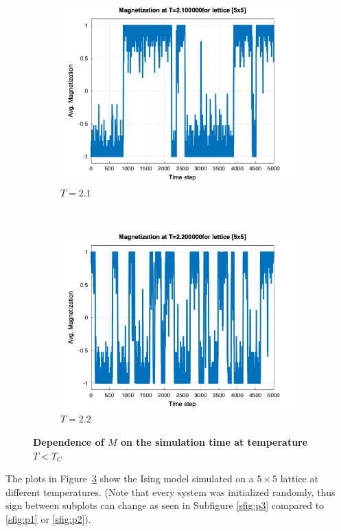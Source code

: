 \begin{figure}[t]
\begin{subfigure}{0.5\textwidth}
		\includegraphics[width=\textwidth]{./img/mag_time_2.100000_5.png}
		\caption{$T=2.1$}
		\label{sfig:p5}
	\end{subfigure}%
	~
	\begin{subfigure}{0.5\textwidth}
		\includegraphics[width=\textwidth]{./img/mag_time_2.200000_5.png}
		\caption{$T=2.2$}
		\label{sfig:p6}
	\end{subfigure}%

	\caption{\textbf{Dependence of $M$ on the simulation time at temperature $T < T_C$}
	}
	\label{fig:mag_time}
\end{figure}
The plots in Figure~\ref{fig:mag_time} show the Ising model simulated on a $5 \times 5$ lattice at different temperatures. (Note that every system was initialized randomly, thus sign between subplots can change as seen in Subfigure \ref{sfig:p3} compared to \ref{sfig:p1} or \ref{sfig:p2}).
